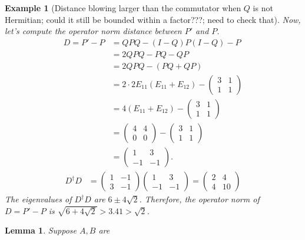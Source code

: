 \documentclass[12pt]{article}
\theoremstyle{plain}
\newtheorem{lemma}[theorem]{Lemma}
\newtheorem{example}{Example}[section]
\begin{document}
\begin{example}[Distance blowing larger than the commutator when $Q$ is not Hermitian; could it still be bounded within a factor???; need to check that]
\noindent Now, let's compute the operator norm distance between $P'$ and $P$.
\begin{align*}
    D = P' - P &=  QPQ - (I-Q)P(I-Q) - P \\
    &= 2QPQ - PQ - QP \\
    &= 2QPQ - (PQ + QP)\\
    &= 2\cdot 2E_{11} \left(E_{11} + E_{12}\right) - \begin{pmatrix}
        3 & 1\\1&1
    \end{pmatrix}\\
    &= 4\left(E_{11} + E_{12} \right) - \begin{pmatrix}
        3 & 1\\1&1
    \end{pmatrix} \\
    &= \begin{pmatrix}
        4 & 4\\0 & 0
    \end{pmatrix} - \begin{pmatrix}
        3 & 1\\ 1 & 1
    \end{pmatrix} \\
    &= \begin{pmatrix}
        1 & 3\\ -1 & -1
    \end{pmatrix} .
\end{align*}
\begin{align*}
    D^\dagger D &= \begin{pmatrix}
        1 & -1 \\ 3 & -1
    \end{pmatrix} \begin{pmatrix}
        1 & 3\\-1 & -1
    \end{pmatrix} = \begin{pmatrix}2 & 4\\4&10
    \end{pmatrix}
\end{align*}
The eigenvalues of $D^\dagger D$ are $6 \pm 4\sqrt{2}$. Therefore, the operator norm of $D = P' - P$ is $\sqrt{6 + 4\sqrt{2}} > 3.41 > \sqrt{2}$.
\end{example}

\begin{lemma}
    Suppose $A, B$ are 
\end{lemma}

\newpage
\end{document}
